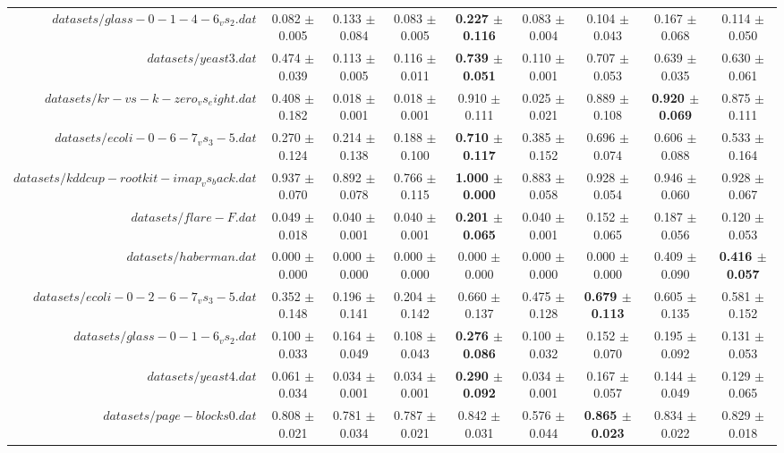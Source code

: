 \begin{table}[!ht]
{\begin{tabular}{r c c c c c c c c}
$datasets/glass-0-1-4-6_vs_2.dat$ & 0.082 $\pm$ 0.005 & 0.133 $\pm$ 0.084 & 0.083 $\pm$ 0.005 & \textbf{0.227 $\pm$ 0.116} & 0.083 $\pm$ 0.004 & 0.104 $\pm$ 0.043 & 0.167 $\pm$ 0.068 & 0.114 $\pm$ 0.050 \\
$datasets/yeast3.dat$ & 0.474 $\pm$ 0.039 & 0.113 $\pm$ 0.005 & 0.116 $\pm$ 0.011 & \textbf{0.739 $\pm$ 0.051} & 0.110 $\pm$ 0.001 & 0.707 $\pm$ 0.053 & 0.639 $\pm$ 0.035 & 0.630 $\pm$ 0.061 \\
$datasets/kr-vs-k-zero_vs_eight.dat$ & 0.408 $\pm$ 0.182 & 0.018 $\pm$ 0.001 & 0.018 $\pm$ 0.001 & 0.910 $\pm$ 0.111 & 0.025 $\pm$ 0.021 & 0.889 $\pm$ 0.108 & \textbf{0.920 $\pm$ 0.069} & 0.875 $\pm$ 0.111 \\
$datasets/ecoli-0-6-7_vs_3-5.dat$ & 0.270 $\pm$ 0.124 & 0.214 $\pm$ 0.138 & 0.188 $\pm$ 0.100 & \textbf{0.710 $\pm$ 0.117} & 0.385 $\pm$ 0.152 & 0.696 $\pm$ 0.074 & 0.606 $\pm$ 0.088 & 0.533 $\pm$ 0.164 \\
$datasets/kddcup-rootkit-imap_vs_back.dat$ & 0.937 $\pm$ 0.070 & 0.892 $\pm$ 0.078 & 0.766 $\pm$ 0.115 & \textbf{1.000 $\pm$ 0.000} & 0.883 $\pm$ 0.058 & 0.928 $\pm$ 0.054 & 0.946 $\pm$ 0.060 & 0.928 $\pm$ 0.067 \\
$datasets/flare-F.dat$ & 0.049 $\pm$ 0.018 & 0.040 $\pm$ 0.001 & 0.040 $\pm$ 0.001 & \textbf{0.201 $\pm$ 0.065} & 0.040 $\pm$ 0.001 & 0.152 $\pm$ 0.065 & 0.187 $\pm$ 0.056 & 0.120 $\pm$ 0.053 \\
$datasets/haberman.dat$ & 0.000 $\pm$ 0.000 & 0.000 $\pm$ 0.000 & 0.000 $\pm$ 0.000 & 0.000 $\pm$ 0.000 & 0.000 $\pm$ 0.000 & 0.000 $\pm$ 0.000 & 0.409 $\pm$ 0.090 & \textbf{0.416 $\pm$ 0.057} \\
$datasets/ecoli-0-2-6-7_vs_3-5.dat$ & 0.352 $\pm$ 0.148 & 0.196 $\pm$ 0.141 & 0.204 $\pm$ 0.142 & 0.660 $\pm$ 0.137 & 0.475 $\pm$ 0.128 & \textbf{0.679 $\pm$ 0.113} & 0.605 $\pm$ 0.135 & 0.581 $\pm$ 0.152 \\
$datasets/glass-0-1-6_vs_2.dat$ & 0.100 $\pm$ 0.033 & 0.164 $\pm$ 0.049 & 0.108 $\pm$ 0.043 & \textbf{0.276 $\pm$ 0.086} & 0.100 $\pm$ 0.032 & 0.152 $\pm$ 0.070 & 0.195 $\pm$ 0.092 & 0.131 $\pm$ 0.053 \\
$datasets/yeast4.dat$ & 0.061 $\pm$ 0.034 & 0.034 $\pm$ 0.001 & 0.034 $\pm$ 0.001 & \textbf{0.290 $\pm$ 0.092} & 0.034 $\pm$ 0.001 & 0.167 $\pm$ 0.057 & 0.144 $\pm$ 0.049 & 0.129 $\pm$ 0.065 \\
$datasets/page-blocks0.dat$ & 0.808 $\pm$ 0.021 & 0.781 $\pm$ 0.034 & 0.787 $\pm$ 0.021 & 0.842 $\pm$ 0.031 & 0.576 $\pm$ 0.044 & \textbf{0.865 $\pm$ 0.023} & 0.834 $\pm$ 0.022 & 0.829 $\pm$ 0.018 \\

\end{tabular}}
\end{table}
